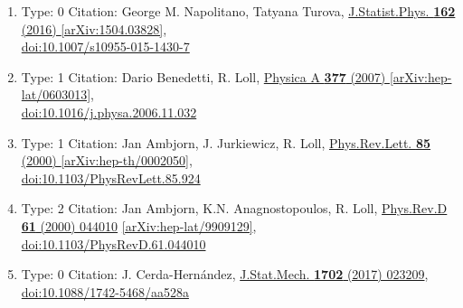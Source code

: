 \documentclass[a4paper,10pt]{article}
\begin{document}
\begin{enumerate}
\begin{enumerate}
  \item Type: 0 Citation: George M. Napolitano, Tatyana Turova, \href{https://www.doi.org/10.1007/s10955-015-1430-7}{J.Statist.Phys. {\bf 162} (2016) }  \href{https://arxiv.org/abs/1504.03828}{[arXiv:1504.03828]},\\\href{https://www.doi.org/10.1007/s10955-015-1430-7}{doi:10.1007/s10955-015-1430-7}
  \item Type: 1 Citation: Dario Benedetti, R. Loll, \href{https://www.doi.org/10.1016/j.physa.2006.11.032}{Physica A {\bf 377} (2007) }  \href{https://arxiv.org/abs/hep-lat/0603013}{[arXiv:hep-lat/0603013]},\\\href{https://www.doi.org/10.1016/j.physa.2006.11.032}{doi:10.1016/j.physa.2006.11.032}
  \item Type: 1 Citation: Jan Ambjorn, J. Jurkiewicz, R. Loll, \href{https://www.doi.org/10.1103/PhysRevLett.85.924}{Phys.Rev.Lett. {\bf 85} (2000) }  \href{https://arxiv.org/abs/hep-th/0002050}{[arXiv:hep-th/0002050]},\\\href{https://www.doi.org/10.1103/PhysRevLett.85.924}{doi:10.1103/PhysRevLett.85.924}
  \item Type: 2 Citation: Jan Ambjorn, K.N. Anagnostopoulos, R. Loll, \href{https://www.doi.org/10.1103/PhysRevD.61.044010}{Phys.Rev.D {\bf 61} (2000) 044010}  \href{https://arxiv.org/abs/hep-lat/9909129}{[arXiv:hep-lat/9909129]},\\\href{https://www.doi.org/10.1103/PhysRevD.61.044010}{doi:10.1103/PhysRevD.61.044010}
  \item Type: 0 Citation: J. Cerda-Hernández, \href{https://www.doi.org/10.1088/1742-5468/aa528a}{J.Stat.Mech. {\bf 1702} (2017) 023209},\\\href{https://www.doi.org/10.1088/1742-5468/aa528a}{doi:10.1088/1742-5468/aa528a}

\end{enumerate}
\end{enumerate}
\end{document}
